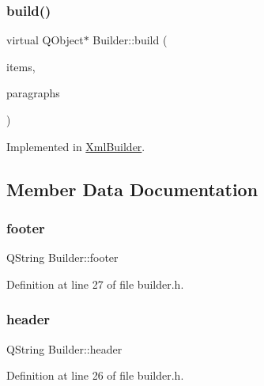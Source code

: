 \subsubsection{\texorpdfstring{build()}{build()}}
{\footnotesize\ttfamily virtual Q\+Object$\ast$ Builder\+::build (\begin{DoxyParamCaption}\item[{Q\+List$<$ \hyperlink{class_item}{Item} $\ast$$>$}]{items,  }\item[{Q\+List$<$ \hyperlink{class_paragraph}{Paragraph} $>$}]{paragraphs }\end{DoxyParamCaption})\hspace{0.3cm}{\ttfamily [pure virtual]}}



Implemented in \hyperlink{class_xml_builder_a29a46891d09f490c19c1063884b66f33}{Xml\+Builder}.



\subsection{Member Data Documentation}
\mbox{\label{class_builder_a5ace791b99eb11341d6f39e35fdd2ce7}} 
\subsubsection{\texorpdfstring{footer}{footer}}
{\footnotesize\ttfamily Q\+String Builder\+::footer\hspace{0.3cm}{\ttfamily [protected]}}



Definition at line 27 of file builder.\+h.

\mbox{\label{class_builder_ae3800e384b079c2d66ab4d8f98cbb4ad}} 
\subsubsection{\texorpdfstring{header}{header}}
{\footnotesize\ttfamily Q\+String Builder\+::header\hspace{0.3cm}{\ttfamily [protected]}}



Definition at line 26 of file builder.\+h.

\mbox{\label{class_builder_ad8ac906f8ce85ebcd061c4ee8e6f6a01}} 
